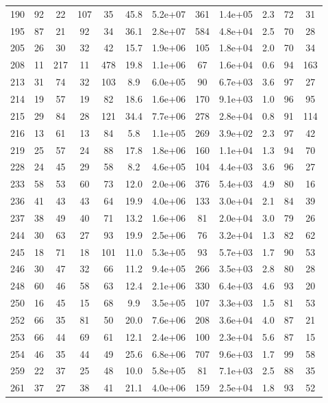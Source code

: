 \begin{table}
\begin{tabular}{cccccccccccc}
190 & 92 & 22 & 107 & 35 & 45.8 & 5.2e+07 & 361 & 1.4e+05 & 2.3 & 72 & 31 \\
195 & 87 & 21 & 92 & 34 & 36.1 & 2.8e+07 & 584 & 4.8e+04 & 2.5 & 70 & 28 \\
205 & 26 & 30 & 32 & 42 & 15.7 & 1.9e+06 & 105 & 1.8e+04 & 2.0 & 70 & 34 \\
208 & 11 & 217 & 11 & 478 & 19.8 & 1.1e+06 & 67 & 1.6e+04 & 0.6 & 94 & 163 \\
213 & 31 & 74 & 32 & 103 & 8.9 & 6.0e+05 & 90 & 6.7e+03 & 3.6 & 97 & 27 \\
214 & 19 & 57 & 19 & 82 & 18.6 & 1.6e+06 & 170 & 9.1e+03 & 1.0 & 96 & 95 \\
215 & 29 & 84 & 28 & 121 & 34.4 & 7.7e+06 & 278 & 2.8e+04 & 0.8 & 91 & 114 \\
216 & 13 & 61 & 13 & 84 & 5.8 & 1.1e+05 & 269 & 3.9e+02 & 2.3 & 97 & 42 \\
219 & 25 & 57 & 24 & 88 & 17.8 & 1.8e+06 & 160 & 1.1e+04 & 1.3 & 94 & 70 \\
228 & 24 & 45 & 29 & 58 & 8.2 & 4.6e+05 & 104 & 4.4e+03 & 3.6 & 96 & 27 \\
233 & 58 & 53 & 60 & 73 & 12.0 & 2.0e+06 & 376 & 5.4e+03 & 4.9 & 80 & 16 \\
236 & 41 & 43 & 43 & 64 & 19.9 & 4.0e+06 & 133 & 3.0e+04 & 2.1 & 84 & 39 \\
237 & 38 & 49 & 40 & 71 & 13.2 & 1.6e+06 & 81 & 2.0e+04 & 3.0 & 79 & 26 \\
244 & 30 & 63 & 27 & 93 & 19.9 & 2.5e+06 & 76 & 3.2e+04 & 1.3 & 82 & 62 \\
245 & 18 & 71 & 18 & 101 & 11.0 & 5.3e+05 & 93 & 5.7e+03 & 1.7 & 90 & 53 \\
246 & 30 & 47 & 32 & 66 & 11.2 & 9.4e+05 & 266 & 3.5e+03 & 2.8 & 80 & 28 \\
248 & 60 & 46 & 58 & 63 & 12.4 & 2.1e+06 & 330 & 6.4e+03 & 4.6 & 93 & 20 \\
250 & 16 & 45 & 15 & 68 & 9.9 & 3.5e+05 & 107 & 3.3e+03 & 1.5 & 81 & 53 \\
252 & 66 & 35 & 81 & 50 & 20.0 & 7.6e+06 & 208 & 3.6e+04 & 4.0 & 87 & 21 \\
253 & 66 & 44 & 69 & 61 & 12.1 & 2.4e+06 & 100 & 2.3e+04 & 5.6 & 87 & 15 \\
254 & 46 & 35 & 44 & 49 & 25.6 & 6.8e+06 & 707 & 9.6e+03 & 1.7 & 99 & 58 \\
259 & 22 & 37 & 25 & 48 & 10.0 & 5.8e+05 & 81 & 7.1e+03 & 2.5 & 88 & 35 \\
261 & 37 & 27 & 38 & 41 & 21.1 & 4.0e+06 & 159 & 2.5e+04 & 1.8 & 93 & 52 \\

\end{tabular}
\end{table}
